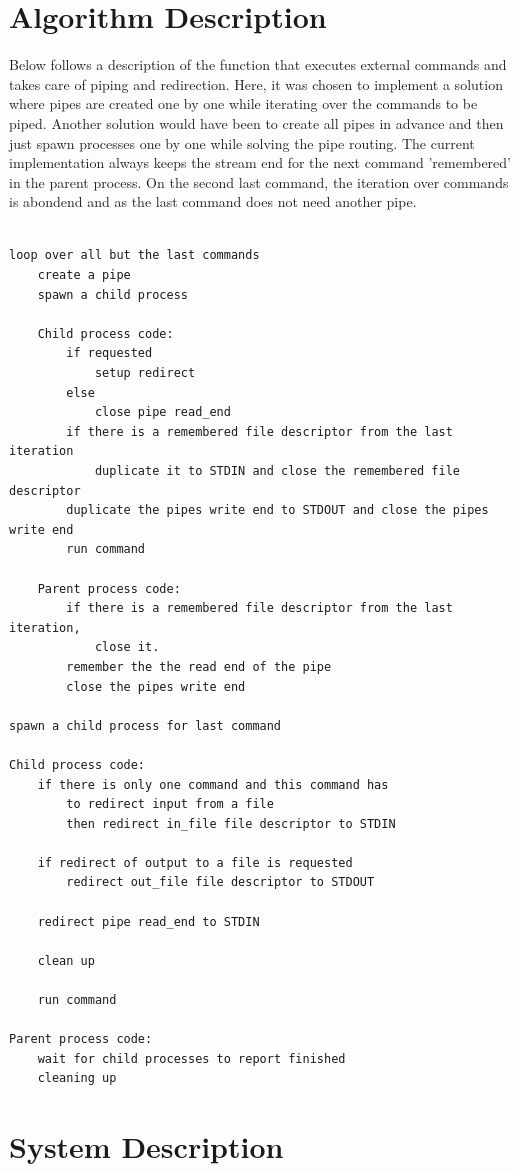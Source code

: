 \documentclass[a4paper,11pt,twoside]{article}
\begin{document}
\section{Algorithm Description}
Below follows a description of the function that executes external commands and takes care of piping and redirection. Here, it was chosen to implement a solution where pipes are created one by one while iterating over the commands to be piped. Another solution would have been to create all pipes in advance and then just spawn processes one by one while solving the pipe routing. The current implementation always keeps the stream end for the next command 'remembered' in the parent process. On the second last command, the iteration over commands is abondend and as the last command does not need another pipe. 


\begin{verbatim}

loop over all but the last commands 
    create a pipe
    spawn a child process

    Child process code:
        if requested 
            setup redirect
        else
            close pipe read_end
        if there is a remembered file descriptor from the last iteration 
            duplicate it to STDIN and close the remembered file descriptor
        duplicate the pipes write end to STDOUT and close the pipes write end
        run command

    Parent process code:
        if there is a remembered file descriptor from the last iteration,
            close it.
        remember the the read end of the pipe 
        close the pipes write end

spawn a child process for last command

Child process code:
    if there is only one command and this command has 
        to redirect input from a file
        then redirect in_file file descriptor to STDIN

    if redirect of output to a file is requested
        redirect out_file file descriptor to STDOUT

    redirect pipe read_end to STDIN

    clean up

    run command

Parent process code:
    wait for child processes to report finished
    cleaning up
\end{verbatim}


\section{System Description}
\end{document}
